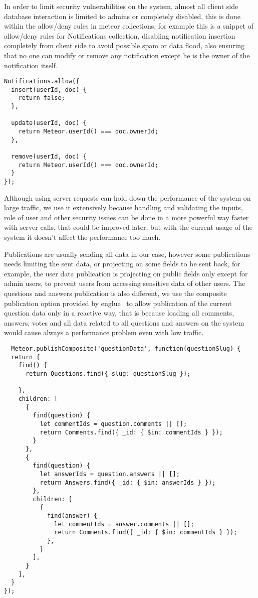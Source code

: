 \newParagraph
In order to limit security vulnerabilities on the system, almost all client side database interaction is limited to admins or completely
disabled, this is done within the allow/deny rules in meteor collections, for example this is a snippet of allow/deny rules for Notifications
collection, disabling notification insertion completely from client side to avoid possible spam or data flood, also ensuring that no one
can modify or remove any notification except he is the owner of the notification itself.

\begin{verbatim}
Notifications.allow({
  insert(userId, doc) {
    return false;
  },

  update(userId, doc) {
    return Meteor.userId() === doc.ownerId;
  },

  remove(userId, doc) {
    return Meteor.userId() === doc.ownerId;
  }
});
\end{verbatim}

\newParagraph
Although using server requests can hold down the performance of the system on large traffic, we use it extensively because handling and validating
the inputs, role of user and other security issues can be done in a more powerful way faster with server calls, that could be improved later, but
with the current usage of the system it doesn't affect the performance too much.

\newParagraph
Publications are usually sending all data in our case, however some publications needs limiting the sent data, or projecting on some fields
to be sent back, for example, the user data publication is projecting on public fields only except for admin users, to prevent users from
accessing sensitive data of other users. The questions and answers publication is also different, we use the composite publication option
provided by englue~\cite{meteor_composite_publish} to allow publication of the current question data only in a reactive way,
that is because loading all comments, answers, votes and all data related to all questions and answers on the system would cause always
a performance problem even with low traffic.

\begin{verbatim}
  Meteor.publishComposite('questionData', function(questionSlug) {
  return {
    find() {
      return Questions.find({ slug: questionSlug });

    },
    children: [
      {
        find(question) {
          let commentIds = question.comments || [];
          return Comments.find({ _id: { $in: commentIds } });
        }
      },
      {
        find(question) {
          let answerIds = question.answers || [];
          return Answers.find({ _id: { $in: answerIds } });
        },
        children: [
          {
            find(answer) {
              let commentIds = answer.comments || [];
              return Comments.find({ _id: { $in: commentIds } });
            },
          }
        ],
      }
    ],
  }
});
\end{verbatim}

